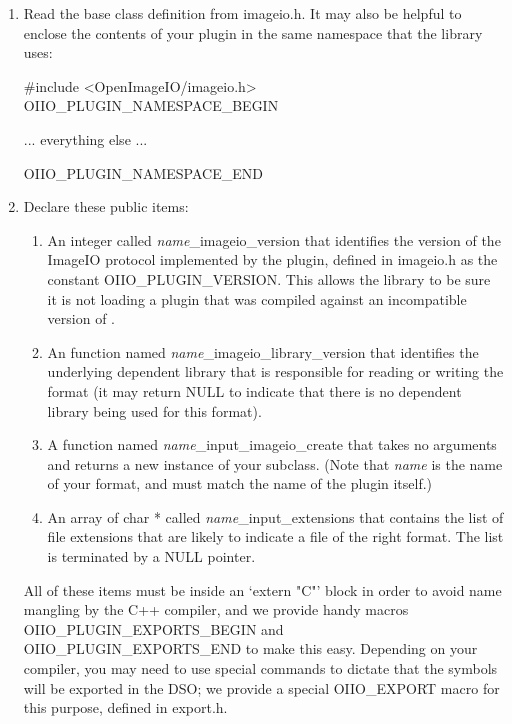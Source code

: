 \begin{enumerate}
\item Read the base class definition from {\fn imageio.h}.  It may also
  be helpful to enclose the contents of your plugin in the same
  namespace that the \product library uses:

  \begin{code}
    #include <OpenImageIO/imageio.h>
    OIIO_PLUGIN_NAMESPACE_BEGIN

    ... everything else ...

    OIIO_PLUGIN_NAMESPACE_END
  \end{code}

\item Declare these public items:

  \begin{enumerate}
    \item An integer called \emph{name}{\cf _imageio_version} that identifies
      the version of the ImageIO protocol implemented by the plugin,
      defined in {\fn imageio.h} as the constant {\cf OIIO_PLUGIN_VERSION}.
      This allows the library to be sure it is not loading a plugin
      that was compiled against an incompatible version of \product.
    \item An function named \emph{name}{\cf _imageio_library_version} that identifies
      the underlying dependent library that is responsible for reading or
      writing the format (it may return {\cf NULL} to indicate that there is
      no dependent library being used for this format).
    \item A function named \emph{name}{\cf _input_imageio_create} that
      takes no arguments and returns a new instance of your \ImageInput
      subclass.  (Note that \emph{name} is the name of your format,
      and must match the name of the plugin itself.)
    \item An array of {\cf char *} called \emph{name}{\cf _input_extensions}
      that contains the list of file extensions that are likely to indicate
      a file of the right format.  The list is terminated by a {\cf NULL}
      pointer.
  \end{enumerate}

  All of these items must be inside an `{\cf extern "C"}' block in order
  to avoid name mangling by the C++ compiler, and we provide handy
  macros {\cf OIIO_PLUGIN_EXPORTS_BEGIN} and {\cf OIIO_PLUGIN_EXPORTS_END}
  to make this easy.  Depending on your
  compiler, you may need to use special commands to dictate that the
  symbols will be exported in the DSO; we provide a special {\cf
  OIIO_EXPORT} macro for this purpose, defined in {\fn export.h}.


\end{enumerate}
